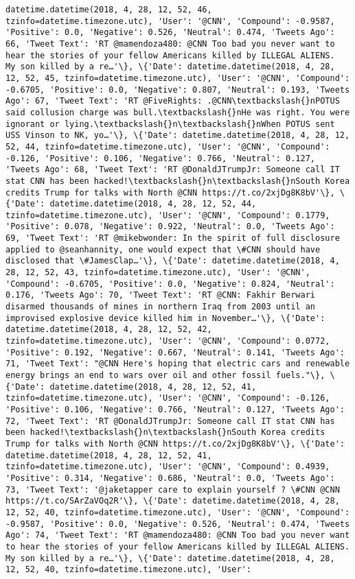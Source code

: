 \documentclass[11pt]{article}
\begin{document}
\begin{Verbatim}[commandchars=\\\{\}]
datetime.datetime(2018, 4, 28, 12, 52, 46, tzinfo=datetime.timezone.utc), 'User': '@CNN', 'Compound': -0.9587, 'Positive': 0.0, 'Negative': 0.526, 'Neutral': 0.474, 'Tweets Ago': 66, 'Tweet Text': 'RT @mamendoza480: @CNN Too bad you never want to hear the stories of your fellow Americans killed by ILLEGAL ALIENS.  My son killed by a re…'\}, \{'Date': datetime.datetime(2018, 4, 28, 12, 52, 45, tzinfo=datetime.timezone.utc), 'User': '@CNN', 'Compound': -0.6705, 'Positive': 0.0, 'Negative': 0.807, 'Neutral': 0.193, 'Tweets Ago': 67, 'Tweet Text': 'RT @FiveRights: .@CNN\textbackslash{}nPOTUS said collusion charge was bull.\textbackslash{}nHe was right. You were ignorant or lying.\textbackslash{}n\textbackslash{}nWhen POTUS sent USS Vinson to NK, yo…'\}, \{'Date': datetime.datetime(2018, 4, 28, 12, 52, 44, tzinfo=datetime.timezone.utc), 'User': '@CNN', 'Compound': -0.126, 'Positive': 0.106, 'Negative': 0.766, 'Neutral': 0.127, 'Tweets Ago': 68, 'Tweet Text': 'RT @DonaldJTrumpJr: Someone call IT stat CNN has been hacked!\textbackslash{}n\textbackslash{}nSouth Korea credits Trump for talks with North @CNN https://t.co/2xjDg8K8bV'\}, \{'Date': datetime.datetime(2018, 4, 28, 12, 52, 44, tzinfo=datetime.timezone.utc), 'User': '@CNN', 'Compound': 0.1779, 'Positive': 0.078, 'Negative': 0.922, 'Neutral': 0.0, 'Tweets Ago': 69, 'Tweet Text': 'RT @mikebwonder: In the spirit of full disclosure applied to @seanhannity, one would expect that \#CNN should have disclosed that \#JamesClap…'\}, \{'Date': datetime.datetime(2018, 4, 28, 12, 52, 43, tzinfo=datetime.timezone.utc), 'User': '@CNN', 'Compound': -0.6705, 'Positive': 0.0, 'Negative': 0.824, 'Neutral': 0.176, 'Tweets Ago': 70, 'Tweet Text': 'RT @CNN: Fakhir Berwari disarmed thousands of mines in northern Iraq from 2003 until an improvised explosive device killed him in November…'\}, \{'Date': datetime.datetime(2018, 4, 28, 12, 52, 42, tzinfo=datetime.timezone.utc), 'User': '@CNN', 'Compound': 0.0772, 'Positive': 0.192, 'Negative': 0.667, 'Neutral': 0.141, 'Tweets Ago': 71, 'Tweet Text': "@CNN Here's hoping that electric cars and renewable energy brings an end to wars over oil and other fossil fuels."\}, \{'Date': datetime.datetime(2018, 4, 28, 12, 52, 41, tzinfo=datetime.timezone.utc), 'User': '@CNN', 'Compound': -0.126, 'Positive': 0.106, 'Negative': 0.766, 'Neutral': 0.127, 'Tweets Ago': 72, 'Tweet Text': 'RT @DonaldJTrumpJr: Someone call IT stat CNN has been hacked!\textbackslash{}n\textbackslash{}nSouth Korea credits Trump for talks with North @CNN https://t.co/2xjDg8K8bV'\}, \{'Date': datetime.datetime(2018, 4, 28, 12, 52, 41, tzinfo=datetime.timezone.utc), 'User': '@CNN', 'Compound': 0.4939, 'Positive': 0.314, 'Negative': 0.686, 'Neutral': 0.0, 'Tweets Ago': 73, 'Tweet Text': '@jaketapper care to explain yourself ? \#CNN @CNN https://t.co/SArZaVOq2R'\}, \{'Date': datetime.datetime(2018, 4, 28, 12, 52, 40, tzinfo=datetime.timezone.utc), 'User': '@CNN', 'Compound': -0.9587, 'Positive': 0.0, 'Negative': 0.526, 'Neutral': 0.474, 'Tweets Ago': 74, 'Tweet Text': 'RT @mamendoza480: @CNN Too bad you never want to hear the stories of your fellow Americans killed by ILLEGAL ALIENS.  My son killed by a re…'\}, \{'Date': datetime.datetime(2018, 4, 28, 12, 52, 40, tzinfo=datetime.timezone.utc), 'User': 
\end{Verbatim}
\end{document}
